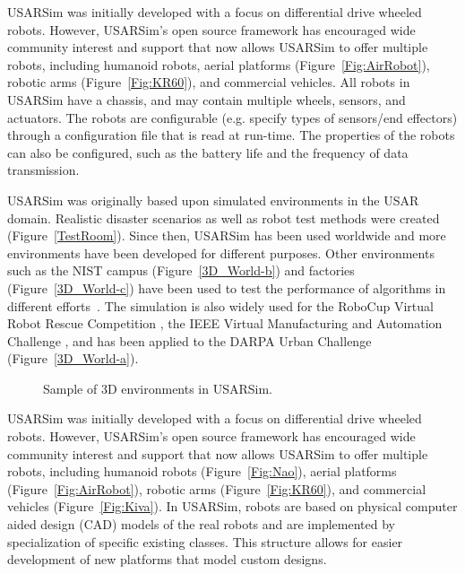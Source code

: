 USARSim was initially developed with a focus on differential drive wheeled robots. However, USARSim's open source framework has encouraged wide community interest and support that now allows USARSim to offer multiple robots, including humanoid robots, aerial platforms (Figure~\ref{Fig:AirRobot}), robotic arms (Figure~\ref{Fig:KR60}), and commercial vehicles. All robots in USARSim have a chassis, and may contain multiple wheels, sensors, and
actuators. The robots are configurable (e.g. specify types of
sensors/end effectors) through a configuration file that is read at run-time. The properties of the robots can
also be configured, such as the battery life and the frequency of
data transmission.

USARSim was originally based upon simulated environments in the USAR domain. Realistic disaster scenarios as well as robot test methods were created (Figure~\ref{TestRoom}).
Since then, USARSim has been used worldwide and more environments have been developed for different purposes. Other environments such as the NIST campus (Figure~\ref{3D_World-b}) and factories (Figure~\ref{3D_World-c}) have been used to test the performance of algorithms in different efforts~\cite{WANG.HFES.2005,BALAGUER.IROS.2008,KOOTBALLY.ITEA.2010}. The simulation is also widely used for the RoboCup Virtual Robot Rescue Competition \cite{RoboCupWeb}, the IEEE Virtual Manufacturing and Automation Challenge \cite{VMACWeb}, and has been applied to the DARPA Urban Challenge (Figure~\ref{3D_World-a}).

\begin{figure}[t!]
\centering
{}\qquad
{}\qquad
{}\qquad%
\caption{Sample of 3D environments in USARSim.} \label{3D_World}
\end{figure}

USARSim was initially developed with a focus on differential drive wheeled robots. However, USARSim's open source framework has encouraged wide community interest and support that now allows USARSim to offer multiple robots, including humanoid robots (Figure~\ref{Fig:Nao}), aerial platforms (Figure~\ref{Fig:AirRobot}), robotic arms (Figure~\ref{Fig:KR60}), and commercial vehicles (Figure~\ref{Fig:Kiva}). In USARSim, robots are based on physical computer aided design (CAD) models of the real
robots and are implemented by specialization of specific existing classes. This structure allows for easier development of new platforms that model custom designs.

